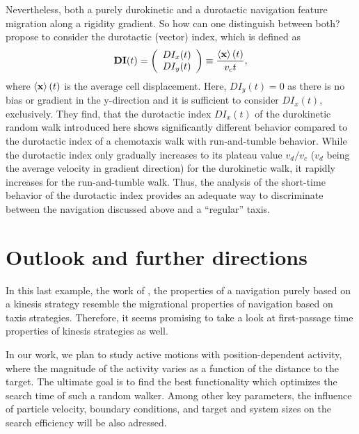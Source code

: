Nevertheless, both a purely durokinetic and a durotactic navigation feature migration along a rigidity gradient. So how can one distinguish between both? \citeauthor{novikova:2017} propose to consider the durotactic (vector) index, which is defined as
\begin{equation*}
 \mathbf{DI}(t) = \left(\begin{array}{c} DI_x(t) \\ DI_y(t) \end{array}\right) \equiv \dfrac{\left<\mathbf{x}\right>(t)}{v_c t},
\end{equation*}
where $\left<\mathbf{x}\right>(t)$ is the average cell displacement. Here, $DI_y(t) = 0$ as there is no bias or gradient in the y-direction and it is sufficient to consider $DI_x(t)$, exclusively. They find, that the durotactic index $DI_x(t)$ of the durokinetic random walk introduced here shows significantly different behavior compared to the durotactic index of a chemotaxis walk with run-and-tumble behavior. While the durotactic index only gradually increases to its plateau value $v_d / v_c$ ($v_d$ being the average velocity in gradient direction) for the durokinetic walk, it rapidly increases for the run-and-tumble walk. Thus, the analysis of the short-time behavior of the durotactic index provides an adequate way to discriminate between the navigation discussed above and a ``regular'' taxis.

\section{Outlook and further directions}

In this last example, the work of , the properties of a navigation purely based on a kinesis strategy resemble the migrational properties of navigation based on taxis strategies. Therefore, it seems promising to take a look at first-passage time properties of kinesis strategies as well.

In our work, we plan to study active motions with position-dependent activity, where the magnitude of the activity varies as a function of the distance to the target. The ultimate goal is to find the best functionality which optimizes the search time of such a random walker. Among other key parameters, the influence of particle velocity, boundary conditions, and target and system sizes on the search efficiency will be also adressed.


